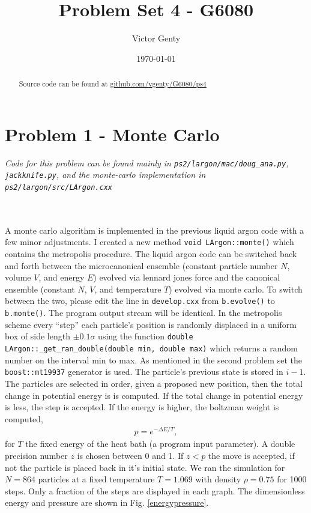 \documentclass[singlepage,notitlepage,nofootinbib,11pt]{revtex4-1}
\newcommand{\eq}[1]{\begin{align*}#1\end{align*}}
\begin{document}
\title{Problem Set 4 - G6080}
\author{Victor Genty}
\date{\today}
\begin{abstract}
\centering
Source code can be found at \href{https://github.com/vgenty/G6080/tree/master/ps4}{github.com/vgenty/G6080/ps4}
\end{abstract}
\maketitle
\section{Problem 1 - Monte Carlo}
\begin{center}{\it Code for this problem can be found mainly in \verb|ps2/largon/mac/doug_ana.py|, \verb|jackknife.py|, and the monte-carlo implementation in \verb|ps2/largon/src/LArgon.cxx|}\end{center}\\\hspace{1pt}\\
\indent A monte carlo algorithm is implemented in the previous liquid argon code with a few minor adjustments. I created a new method \verb|void LArgon::monte()| which contains the metropolis procedure. The liquid argon code can be switched back and forth between the microcanonical ensemble (constant particle number $N$, volume $V$, and energy $E$) evolved via lennard jones force and the canonical ensemble (constant $N$, $V$, and temperature $T$) evolved via monte carlo. To switch between the two, please edit the line in \verb|develop.cxx| from \verb|b.evolve()| to \verb|b.monte()|. The program output stream will be identical. In the metropolis scheme every ``step'' each particle's position is randomly displaced in a uniform box of side length $\pm 0.1\sigma$ using the function \verb|double LArgon::_get_ran_double(double min, double max)| which returns a random number on the interval min to max. As mentioned in the second problem set the \verb|boost::mt19937| generator is used. The particle's previous state is stored in $i-1$. The particles are selected in order, given a proposed new position, then the total change in potential energy is is computed. If the total change in potential energy is less, the step is accepted. If the energy is higher, the boltzman weight is computed,
\eq{
  p = e^{-\Delta E/T},
}
for $T$ the fixed energy of the heat bath (a program input parameter). A double precision number $z$ is chosen between 0 and 1. If $z < p$ the move is accepted, if not the particle is placed back in it's initial state. We ran the simulation for $N=864$ particles at a fixed temperature $T=1.069$ with density $\rho=0.75$ for 1000 steps. Only a fraction of the steps are displayed in each graph. The dimensionless energy and pressure are shown in Fig. \ref{energypressure}.
\end{document}
